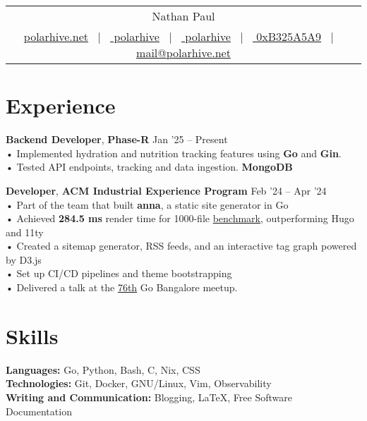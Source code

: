 \documentclass[a4,12pt]{article}
\begin{document}
\begin{tabularx}{\linewidth}{@{}C@{}}
\Huge{Nathan Paul} \\[10pt]
\href{https://polarhive.net}{ polarhive.net} \ $|$ \
\href{https://github.com/polarhive}{ polarhive} \ $|$ \
\href{https://linkedin.com/in/polarhive}{ polarhive} \ $|$ \
\href{https://polarhive.net/.well-known/polarhive_gpg.txt}{ 0xB325A5A9} \ $|$ \
\href{mailto:mail@polarhive.net}{ mail@polarhive.net}
\end{tabularx}

\section{Experience}
\textbf{Backend Developer}, \textbf{Phase-R} \hfill Jan '25 – Present \\
• Implemented hydration and nutrition tracking features using \textbf{Go} and \textbf{Gin}. \\
• Tested API endpoints, tracking and data ingestion. \textbf{MongoDB}

\textbf{Developer}, \textbf{ACM Industrial Experience Program} \hfill Feb '24 – Apr '24 \\
• Part of the team that built \textbf{anna}, a static site generator in Go \\
• Achieved \textbf{284.5 ms} render time for 1000-file \href{https://github.com/anna-ssg/anna/actions}{benchmark}, outperforming Hugo and 11ty \\
• Created a sitemap generator, RSS feeds, and an interactive tag graph powered by D3.js \\
• Set up CI/CD pipelines and theme bootstrapping \\
• Delivered a talk at the \href{https://www.meetup.com/golang-bangalore/events/301697429/}{76th} Go Bangalore meetup.

\section{Skills}
\textbf{Languages:} Go, Python, Bash, C, Nix, CSS \\
\textbf{Technologies:} Git, Docker, GNU/Linux, Vim, Observability \\
\textbf{Writing and Communication:} Blogging, \LaTeX, Free Software Documentation

\end{document}
